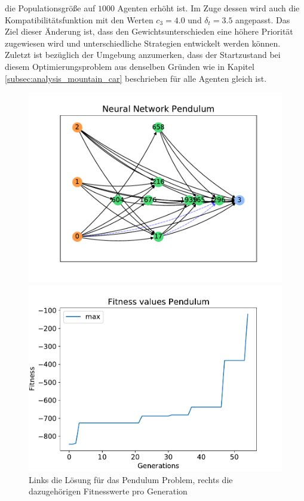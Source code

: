 die Populationsgröße auf $1000$ Agenten erhöht ist. Im Zuge dessen wird auch die Kompatibilitätsfunktion mit den Werten $c_3=4.0$ und $\delta_t=3.5$ angepasst. Das Ziel dieser Änderung ist, dass den Gewichtsunterschieden eine höhere Priorität zugewiesen wird und unterschiedliche Strategien entwickelt werden können. Zuletzt ist bezüglich der Umgebung anzumerken, dass der Startzustand bei diesem Optimierungsproblem aus denselben Gründen wie in Kapitel \ref{subsec:analysis_mountain_car} beschrieben für alle Agenten gleich ist.  
\begin{figure}[!h]
	\centering
	\begin{minipage}[]{0.49\textwidth}
		\includegraphics[width=1.0\textwidth]{./img/pendulum_single_core/pendulum_1_neural_network.pdf} 
	\end{minipage}
	\hfill
	\begin{minipage}[]{0.49\textwidth}
		\includegraphics[width=1.0\textwidth]{./img/pendulum_single_core/pendulum_1_fitness_values.pdf} 
	\end{minipage}
	\caption{Links die Lösung für das Pendulum Problem, rechts die dazugehörigen Fitnesswerte pro Generation}
	\label{fig:pendulum_car_1core_neural_network_and_fitness}
\end{figure}
